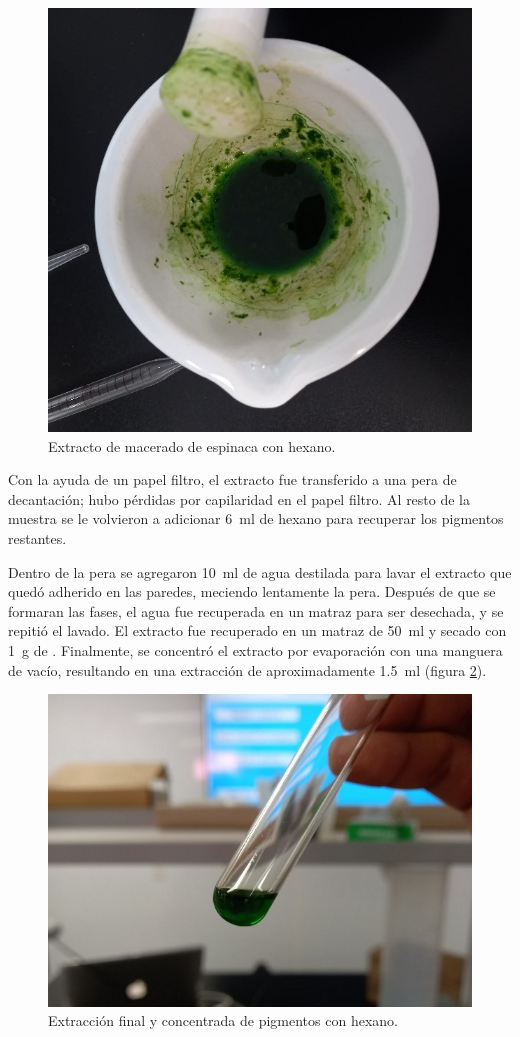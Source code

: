\documentclass{ITESO-Report}
\begin{document}
\begin{figure}[htpb]
    \centering
    \includegraphics[width=0.5\columnwidth]{figuras/extract.jpg}
    \caption{Extracto de macerado de espinaca con hexano.}
    \label{fig:extract}
\end{figure}

Con la ayuda de un papel filtro, el extracto fue transferido a una pera de decantación; hubo pérdidas por capilaridad en el papel filtro. Al resto de la muestra se le volvieron a adicionar \qty{6}{\ml} de hexano para recuperar los pigmentos restantes.

Dentro de la pera se agregaron \qty{10}{\ml} de agua destilada para lavar el extracto que quedó adherido en las paredes, meciendo lentamente la pera. Después de que se formaran las fases, el agua fue recuperada en un matraz para ser desechada, y se repitió el lavado. El extracto fue recuperado en un matraz de \qty{50}{\ml} y secado con \qty{1}{\g} de . Finalmente, se concentró el extracto por evaporación con una manguera de vacío, resultando en una extracción de aproximadamente \qty{1.5}{\ml} (figura \ref{fig:final-extract}).

\begin{figure}[htpb]
    \centering
    \includegraphics[width=0.5\columnwidth]{figuras/final_extract.jpg}
    \caption{Extracción final y concentrada de pigmentos con hexano.}
    \label{fig:final-extract}
\end{figure}
\end{document}
